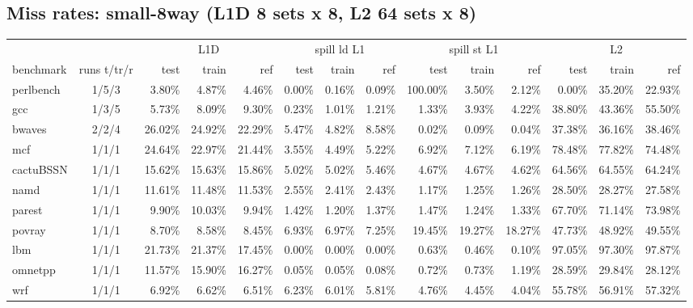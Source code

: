 \documentclass[10pt,a4paper,landscape]{article}
\begin{document}
\subsection*{Miss rates: small-8way (L1D 8 sets x 8, L2 64 sets x 8)}
{\footnotesize
\begin{longtable}{lcrrrrrrrrrrrr}
\toprule
& & \multicolumn{3}{c}{L1D} & \multicolumn{3}{c}{spill ld L1} & \multicolumn{3}{c}{spill st L1} & \multicolumn{3}{c}{L2} \\
\cmidrule(lr){3-5}\cmidrule(lr){6-8}\cmidrule(lr){9-11}\cmidrule(lr){12-14}
benchmark & runs t/tr/r & test & train & ref & test & train & ref & test & train & ref & test & train & ref \\
\midrule
\endhead
\bottomrule
\endfoot
perlbench & 1/5/3 & 3.80\% & 4.87\% & 4.46\% & 0.00\% & 0.16\% & 0.09\% & 100.00\% & 3.50\% & 2.12\% & 0.00\% & 35.20\% & 22.93\% \\
gcc & 1/3/5 & 5.73\% & 8.09\% & 9.30\% & 0.23\% & 1.01\% & 1.21\% & 1.33\% & 3.93\% & 4.22\% & 38.80\% & 43.36\% & 55.50\% \\
bwaves & 2/2/4 & 26.02\% & 24.92\% & 22.29\% & 5.47\% & 4.82\% & 8.58\% & 0.02\% & 0.09\% & 0.04\% & 37.38\% & 36.16\% & 38.46\% \\
mcf & 1/1/1 & 24.64\% & 22.97\% & 21.44\% & 3.55\% & 4.49\% & 5.22\% & 6.92\% & 7.12\% & 6.19\% & 78.48\% & 77.82\% & 74.48\% \\
cactuBSSN & 1/1/1 & 15.62\% & 15.63\% & 15.86\% & 5.02\% & 5.02\% & 5.46\% & 4.67\% & 4.67\% & 4.62\% & 64.56\% & 64.55\% & 64.24\% \\
namd & 1/1/1 & 11.61\% & 11.48\% & 11.53\% & 2.55\% & 2.41\% & 2.43\% & 1.17\% & 1.25\% & 1.26\% & 28.50\% & 28.27\% & 27.58\% \\
parest & 1/1/1 & 9.90\% & 10.03\% & 9.94\% & 1.42\% & 1.20\% & 1.37\% & 1.47\% & 1.24\% & 1.33\% & 67.70\% & 71.14\% & 73.98\% \\
povray & 1/1/1 & 8.70\% & 8.58\% & 8.45\% & 6.93\% & 6.97\% & 7.25\% & 19.45\% & 19.27\% & 18.27\% & 47.73\% & 48.92\% & 49.55\% \\
lbm & 1/1/1 & 21.73\% & 21.37\% & 17.45\% & 0.00\% & 0.00\% & 0.00\% & 0.63\% & 0.46\% & 0.10\% & 97.05\% & 97.30\% & 97.87\% \\
omnetpp & 1/1/1 & 11.57\% & 15.90\% & 16.27\% & 0.05\% & 0.05\% & 0.08\% & 0.72\% & 0.73\% & 1.19\% & 28.59\% & 29.84\% & 28.12\% \\
wrf & 1/1/1 & 6.92\% & 6.62\% & 6.51\% & 6.23\% & 6.01\% & 5.81\% & 4.76\% & 4.45\% & 4.04\% & 55.78\% & 56.91\% & 57.32\% \\

\end{longtable}}
\end{document}
